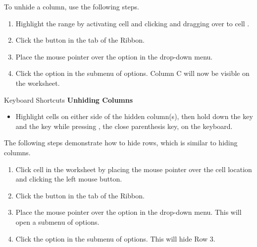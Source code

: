 To unhide a column, use the following steps.

\begin{enumerate}
	\item Highlight the range  by activating cell  and clicking and dragging over to cell .
	\item Click the  button in the  tab of the Ribbon.
	\item Place the mouse pointer over the  option in the drop-down menu.
	\item Click the  option in the submenu of options. Column C will now be visible on the worksheet.
\end{enumerate}

\begin{center}
	\begin{shtcutbox}{Keyboard Shortcuts}
		\textbf{Unhiding Columns}
		\\
		\begin{itemize}
			\setlength{\itemsep}{0pt}
			\setlength{\parskip}{0pt}
			\setlength{\parsep}{0pt}
			
			\item Highlight cells on either side of the hidden column(s), then hold down the  key and the  key while pressing \fmtKeystroke{)}, the close parenthesis key, on the keyboard.
			
		\end{itemize}
	\end{shtcutbox}
\end{center}

The following steps demonstrate how to hide rows, which is similar to hiding columns.

\begin{enumerate}
	\item Click cell  in the  worksheet by placing the mouse pointer over the cell location and clicking the left mouse button.
	\item Click the  button in the  tab of the Ribbon.
	\item Place the mouse pointer over the  option in the drop-down menu. This will open a submenu of options.
	\item Click the  option in the submenu of options. This will hide Row 3.
\end{enumerate}

